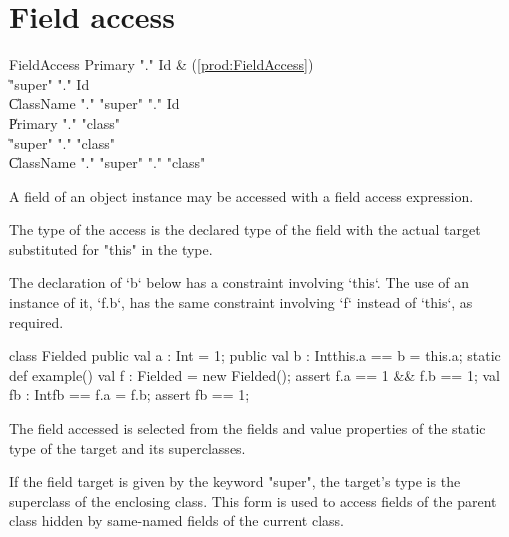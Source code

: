 \section{Field access}
\label{FieldAccess}

\begin{bbgrammar}
         FieldAccess \: Primary \xcd"." Id & (\ref{prod:FieldAccess}) \\
                    \| \xcd"super" \xcd"." Id \\
                    \| ClassName \xcd"." \xcd"super"  \xcd"." Id \\
                    \| Primary \xcd"." \xcd"class"  \\
                    \| \xcd"super" \xcd"." \xcd"class"  \\
                    \| ClassName \xcd"." \xcd"super"  \xcd"." \xcd"class"  \\
\end{bbgrammar}

A field of an object instance may be  accessed
with a field access expression.

The type of the access is the declared type of the field with the
actual target substituted for \xcd"this" in the type. 

\begin{ex}
The declaration of \xcd`b` below has a constraint involving \xcd`this`.  
The use of an instance of it, \xcd`f.b`, has the same constraint involving
\xcd`f` instead of \xcd`this`, as required.
\begin{xten}
class Fielded {
  public val a : Int = 1;
  public val b : Int{this.a == b} = this.a;
  static def example() {
    val f : Fielded = new Fielded();
    assert f.a == 1 && f.b == 1;
    val fb : Int{fb == f.a} = f.b;
    assert fb == 1;
  }
}
\end{xten}

\end{ex}

The field accessed is selected from the fields and value properties
of the static type of the target and its superclasses.

If the field target is given by the keyword \xcd"super", the target's type is
the superclass of the enclosing class.  This form is used to access fields of
the parent class hidden by same-named fields of the current class.

